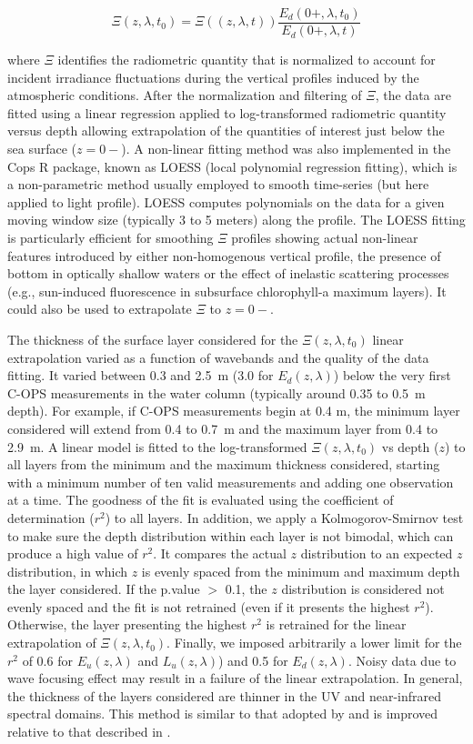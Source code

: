 \documentclass[essd, manuscript]{copernicus}
\begin{document}
\begin{equation}
\Xi(z,\lambda,t_0) = \Xi((z,\lambda,t))\frac{E_d(0+,\lambda,t_0)}{E_d(0+,\lambda,t)}
\label{eq:xi}
\end{equation}

where $\Xi$ identifies the radiometric quantity that is normalized to account for incident irradiance fluctuations during the vertical profiles induced by the atmospheric conditions. After the normalization and filtering of $\Xi$, the data are fitted using a linear regression applied to log-transformed radiometric quantity versus depth allowing extrapolation of the quantities of interest just below the sea surface ($z=0-$). A non-linear fitting method was also implemented in the Cops R package, known as LOESS (local polynomial regression fitting), which is a non-parametric method usually employed to smooth time-series (but here applied to light profile). LOESS computes polynomials on the data for a given moving window size (typically 3 to 5 meters) along the profile. The LOESS fitting is particularly efficient for smoothing $\Xi$ profiles showing actual non-linear features introduced by either non-homogenous vertical profile, the presence of bottom in optically shallow waters or the effect of inelastic scattering processes (e.g., sun-induced fluorescence in subsurface chlorophyll-a maximum layers).  It could also be used to extrapolate $\Xi$ to $z=0-$. 

The thickness of the surface layer considered for the $\Xi(z,\lambda,t_0)$ linear extrapolation varied as a function of wavebands and the quality of the data fitting. It varied between 0.3 and 2.5~m (3.0 for $E_d(z,\lambda)$) below the very first C-OPS measurements in the water column (typically around 0.35 to 0.5~m depth). For example, if C-OPS measurements begin at 0.4 m, the minimum layer considered will extend from 0.4 to 0.7~m and the maximum layer from 0.4 to 2.9~m. A linear model is fitted to the log-transformed $\Xi(z,\lambda,t_0)$ vs depth ($z$) to all layers from the minimum and the maximum thickness considered, starting with a minimum number of ten valid measurements and adding one observation at a time. The goodness of the fit is evaluated using the coefficient of determination ($r^2$) to all layers. In addition, we apply a Kolmogorov-Smirnov test to make sure the depth distribution within each layer is not bimodal, which can produce a high value of $r^2$. It compares the actual $z$ distribution to an expected $z$ distribution, in which $z$ is evenly spaced from the minimum and maximum depth the layer considered. If the p.value $>$ 0.1, the $z$ distribution is considered not evenly spaced and the fit is not retrained (even if it presents the highest $r^2$). Otherwise, the layer presenting the highest $r^2$ is retrained for the linear extrapolation of $\Xi(z,\lambda,t_0)$. Finally, we imposed arbitrarily a lower limit for the $r^2$ of 0.6 for $E_u(z,\lambda)$ and $L_u(z,\lambda)$) and 0.5 for $E_d(z,\lambda)$. Noisy data due to wave focusing effect may result in a failure of the linear extrapolation. In general, the thickness of the layers considered are thinner in the UV and near-infrared spectral domains. This method is similar to that adopted by \citet{Antoine2013a} and is improved relative to that described in \citet{Belanger2017}. 
\end{document}
